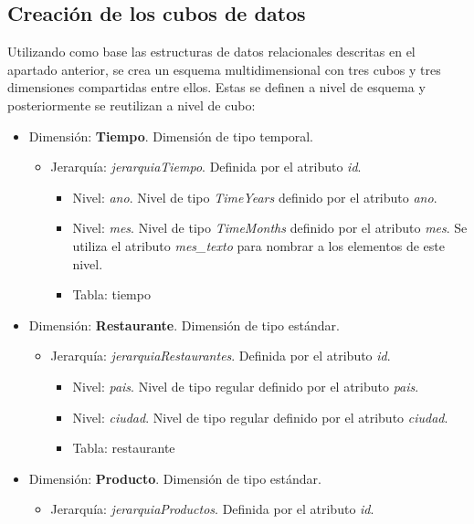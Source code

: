 \documentclass[11pt]{opticajnl}
\begin{document}
\newpage 

\subsection{Creación de los cubos de datos}

Utilizando como base las estructuras de datos relacionales descritas en el apartado anterior, se crea un esquema multidimensional con tres cubos y tres dimensiones compartidas entre ellos. Estas se definen a nivel de esquema y posteriormente se reutilizan a nivel de cubo:

\begin{itemize}
\item Dimensión: \textbf{Tiempo}. Dimensión de tipo temporal.
\begin{itemize}
\item Jerarquía: \textit{jerarquiaTiempo}. Definida por el atributo \textit{id}. 
\begin{itemize}
\item Nivel: \textit{ano}. Nivel de tipo \textit{TimeYears} definido por el atributo \textit{ano}.
\item Nivel: \textit{mes}. Nivel de tipo \textit{TimeMonths} definido por el atributo \textit{mes}. Se utiliza el atributo \textit{mes\_texto} para nombrar a los elementos de este nivel.
\item Tabla: tiempo
\end{itemize}
\end{itemize}
\item Dimensión: \textbf{Restaurante}. Dimensión de tipo estándar.
\begin{itemize}
\item Jerarquía: \textit{jerarquiaRestaurantes}. Definida por el atributo \textit{id}.
\begin{itemize}
\item Nivel: \textit{pais}. Nivel de tipo regular definido por el atributo \textit{pais}.
\item Nivel: \textit{ciudad}. Nivel de tipo regular definido por el atributo \textit{ciudad}.
\item Tabla: restaurante
\end{itemize}
\end{itemize}
\item Dimensión: \textbf{Producto}. Dimensión de tipo estándar.
\begin{itemize}
\item Jerarquía: \textit{jerarquiaProductos}. Definida por el atributo \textit{id}.

\end{itemize}
\end{itemize}
\end{document}
